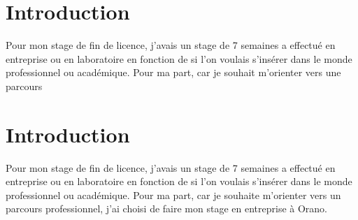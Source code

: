 \section{Introduction}

Pour mon stage de fin de licence, j'avais un stage de 7 semaines a effectué en entreprise ou en laboratoire en fonction de si l'on voulais s'insérer dans le monde professionnel ou académique. Pour ma part, car je souhait m'orienter vers une parcours \section{Introduction}

Pour mon stage de fin de licence, j'avais un stage de 7 semaines a effectué en entreprise ou en laboratoire en fonction de si l'on voulais s'insérer dans le monde professionnel ou académique. Pour ma part, car je souhaite  m'orienter vers un parcours professionnel, j'ai choisi de faire mon stage en entreprise à Orano.
